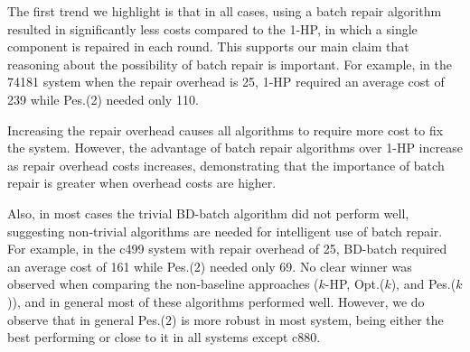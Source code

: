 

The first trend we highlight is that in all cases, using a batch repair algorithm resulted in significantly less costs compared to the 1-HP, in which a single component is repaired in each round. This supports our main claim that reasoning about the possibility of batch repair is important. For example, in the 74181 system when the repair overhead is 25, 1-HP required an average cost of 239 while Pes.(2) needed only 110.  


Increasing the repair overhead causes all algorithms to require more cost to fix the system. However, the advantage of batch repair algorithms over 1-HP increase as repair overhead costs increases, demonstrating that the importance of batch repair is greater when overhead costs are higher. 

Also, in most cases the trivial BD-batch algorithm did not perform well, suggesting non-trivial algorithms are needed for intelligent use of batch repair. For example, in the c499 system with repair overhead of 25, BD-batch required an average cost of 161 while Pes.(2) needed only 69. No clear winner was observed when comparing the non-baseline approaches ($k$-HP, Opt.($k$), and Pes.($k$)), and in general most of these algorithms performed well. 
However, we do observe that in general Pes.($2$) is more robust in most system, being either the best performing or close to it in all systems except c880. 